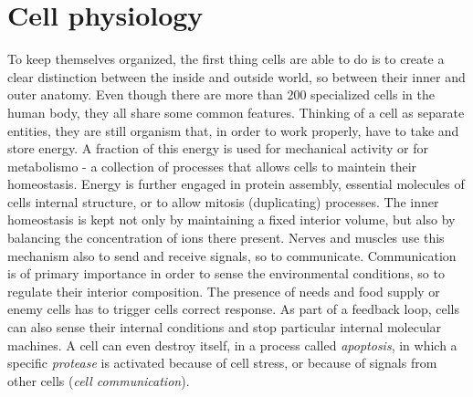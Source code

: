 \documentclass[../main/main.tex]{subfiles}
\begin{document}
\section{Cell physiology}



To keep themselves organized, the first thing cells are able to do is to create a clear distinction between the inside and outside world, so between their inner and outer anatomy. Even though there are more than 200 specialized cells in the human body, they all share some common features. Thinking of a cell as separate entities, they are still organism that, in order to work properly, have to take and store energy. A fraction of this energy is used for mechanical activity or for metabolismo - a collection of processes that allows cells to maintein their homeostasis. Energy is further engaged in protein assembly, essential molecules of cells internal structure, or to allow mitosis (duplicating) processes.
The inner homeostasis is kept not only by maintaining a fixed interior volume, but also by balancing the concentration of ions there present. Nerves and muscles use this mechanism also to send and receive signals, so to communicate. Communication is of primary importance in order to sense the environmental conditions, so to regulate their interior composition. The presence of needs and food supply or enemy cells has to trigger cells correct response. As part of a feedback loop, cells can also sense their internal conditions and stop particular internal molecular machines.
A cell can even destroy itself, in a process called \emph{apoptosis}, in which a specific \emph{protease} is activated because of cell stress, or because of signals from other cells (\emph{cell communication}). 
\end{document}
